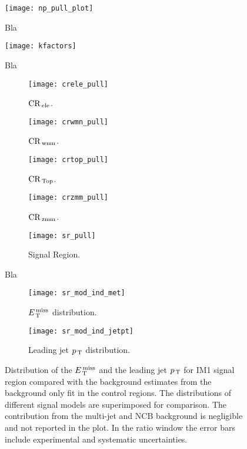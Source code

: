 \begin{figure}[!th]
  \centering
  \texttt{[image: np\_pull\_plot]}
  \caption{Bla}
  \label{fig:np_pull}
\end{figure}
\begin{figure}[!th]
  \centering
  \texttt{[image: kfactors]}
  \caption{Bla}
  \label{fig:kfactors}
\end{figure}
\begin{figure}[!th]
  \centering
  \begin{subfigure}[t]{.48\linewidth}
    \texttt{[image: crele\_pull]}
    \caption{$\mathrm{CR}_\mathrm{\, ele}$.}
    \label{fig:crele_pull}
  \end{subfigure}
  \begin{subfigure}[t]{.48\linewidth}
    \texttt{[image: crwmn\_pull]}
    \caption{$\mathrm{CR}_\mathrm{\, wmn}$.}
    \label{fig:crwnm_pull}
  \end{subfigure}
  \begin{subfigure}[t]{.48\linewidth}
    \texttt{[image: crtop\_pull]}
    \caption{$\mathrm{CR}_\mathrm{\, Top}$.}
    \label{fig:crtop_pull}
  \end{subfigure}
    \begin{subfigure}[t]{.48\linewidth}
    \texttt{[image: crzmm\_pull]}
    \caption{$\mathrm{CR}_\mathrm{\, zmm}$.}
    \label{fig:crzmm_pull}
  \end{subfigure}
  \begin{subfigure}[t]{.48\linewidth}
    \texttt{[image: sr\_pull]}
    \caption{Signal Region.}
    \label{fig:sr_pull}
  \end{subfigure}
  \caption{Bla}
  \label{fig:reagion_pulls}
\end{figure}
\begin{figure}[!th]
  \centering
  \begin{subfigure}[t]{.48\linewidth}
    \texttt{[image: sr\_mod\_ind\_met]}
    \caption{$E_\mathrm{\, T}^\mathrm{\, miss}$ distribution.}
    \label{fig:sr_et_miss}
  \end{subfigure}
  \begin{subfigure}[t]{.48\linewidth}
    \texttt{[image: sr\_mod\_ind\_jetpt]}
    \caption{Leading jet $p_\mathrm{\, T}$ distribution.}
    \label{fig:sr_jet1_pt}
  \end{subfigure}
  \caption{Distribution of the $E_\mathrm{\, T}^\mathrm{\, miss}$ and the leading jet $p_\mathrm{\, T}$ for IM1 signal
    region compared with the background estimates from the background only fit
    in the control regions. The distributions of different signal models are
    superimposed for comparison. The contribution from the multi-jet and NCB
    background is negligible and not reported in the plot. In the ratio window
    the error bars include experimental and systematic uncertainties.}
  \label{fig:sr_plots}
\end{figure}

